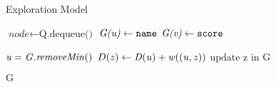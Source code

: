 \documentclass{article}
\begin{document}
\begin{algorithm}
\caption{Exploration Model}\label{graph}
\begin{algorithmic}[1]
		\State $\textit{node} \gets \text{Q.dequeue()}$
		\State $\textit{G(\it{u})} \gets \texttt{name}$
		\State $\textit{G(\it{v})} \gets \texttt{score}$
	\EndIf
\EndWhile\label{euclidendwhile}

	\State $\it{u} = G.removeMin()$
			\State $D(\it{z}) \gets D(\it{u}) + w((\it{u, z}))$
			\State $\text{update z in G}$
		\EndIf
	\EndFor
\EndWhile

\Return $\text{G}$
\EndProcedure
\end{algorithmic}
\end{algorithm}
\end{document}
